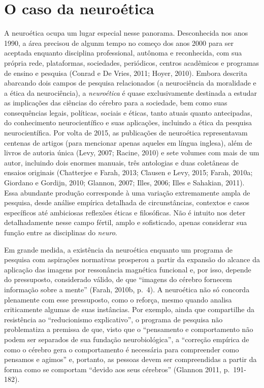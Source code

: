 \section{O caso da neuroética}

A neuroética ocupa um lugar especial nesse panorama. Desconhecida nos
anos 1990, a área precisou de algunm tempo no começo dos anos 2000 para
ser aceptada enquanto disciplina professional, autônoma e reconhecida,
com sua própria rede, plataformas, sociedades, periódicos, centros
acadêmicos e programas de ensino e pesquisa (Conrad e De Vries, 2011;
Hoyer, 2010). Embora descrita abarcando dois campos de pesquisa
relacionados (a neurociência da moralidade e a ética da neurociência), a
\emph{neuroética} é quase exclusivamente destinada a estudar as
implicações das ciências do cérebro para a sociedade, bem como suas
consequências legais, políticas, sociais e éticas, tanto atuais quanto
antecipadas, do conhecimento neurocientífico e suas aplicações,
incluindo a ética da pesquisa neurocientífica. Por volta de 2015, as
publicações de neuroética representavam centenas de artigos (para
mencionar apenas aqueles em língua inglesa), além de livros de autoria
única (Levy, 2007; Racine, 2010) e sete volumes com mais de um autor,
incluindo dois enormes manuais, três antologias e duas coletâneas de
ensaios originais (Chatterjee e Farah, 2013; Clausen e Levy, 2015;
Farah, 2010a; Giordano e Gordijn, 2010; Glannon, 2007; Illes, 2006;
Illes e Sahakian, 2011). Essa abundante produção corresponde à uma
variação extremamente ampla de pesquisa, desde análise empírica
detalhada de circunstâncias, contextos e casos específicos até
ambiciosas reflexões éticas e filosóficas. Não é intuito nos deter
detalhadamente nesse campo fértil, amplo e sofisticado, apenas
considerar sua função entre as disciplinas do \emph{neuro}.

Em grande medida, a existência da neuroética enquanto um programa de
pesquisa com aspirações normativas prosperou a partir da expansão do
alcance da aplicação das imagens por ressonância magnética funcional e,
por isso, depende do pressuposto, considerado válido, de que ``imagens
do cérebro fornecem informação sobre a mente'' (Farah, 2010b, p.~4). A
neuroética não só concorda plenamente com esse pressuposto, como o
reforça, mesmo quando analisa criticamente algumas de suas instâncias.
Por exemplo, ainda que compartilhe da resistência ao ``reducionismo
explicativo'', o programa de pesquisa não problematiza a premissa de
que, visto que o ``pensamento e comportamento não podem ser separados de
sua fundação neurobiológica'', a ``correção empírica de como o cérebro
gera o comportamento é necessária para compreender como pensamos e
agimos'' e, portanto, as pessoas devem ser compreendidas a partir da
forma como se comportam ``devido aos seus cérebros'' (Glannon 2011,
p.~191-182).

